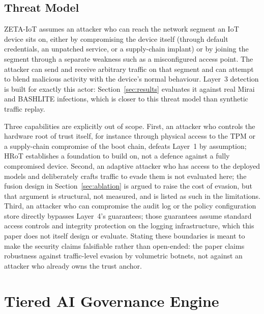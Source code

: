 \documentclass[sigconf,review,anonymous]{acmart}
\begin{document}
\subsection{Threat Model}
\label{sec:threat}

ZETA-IoT assumes an attacker who can reach the network segment an IoT device sits on, either by compromising the device itself (through default credentials, an unpatched service, or a supply-chain implant) or by joining the segment through a separate weakness such as a misconfigured access point. The attacker can send and receive arbitrary traffic on that segment and can attempt to blend malicious activity with the device's normal behaviour. Layer~3 detection is built for exactly this actor: Section~\ref{sec:results} evaluates it against real Mirai and BASHLITE infections, which is closer to this threat model than synthetic traffic replay.

Three capabilities are explicitly out of scope. First, an attacker who controls the hardware root of trust itself, for instance through physical access to the TPM or a supply-chain compromise of the boot chain, defeats Layer~1 by assumption; HRoT establishes a foundation to build on, not a defence against a fully compromised device. Second, an adaptive attacker who has access to the deployed models and deliberately crafts traffic to evade them is not evaluated here; the fusion design in Section~\ref{sec:ablation} is argued to raise the cost of evasion, but that argument is structural, not measured, and is listed as such in the limitations. Third, an attacker who can compromise the audit log or the policy configuration store directly bypasses Layer~4's guarantees; those guarantees assume standard access controls and integrity protection on the logging infrastructure, which this paper does not itself design or evaluate. Stating these boundaries is meant to make the security claims falsifiable rather than open-ended: the paper claims robustness against traffic-level evasion by volumetric botnets, not against an attacker who already owns the trust anchor.

\section{Tiered AI Governance Engine}
\label{sec:taige}
\end{document}
